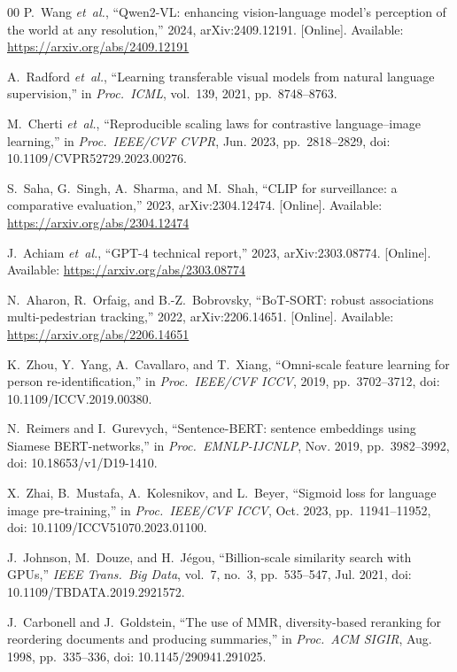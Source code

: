 ﻿\documentclass[conference]{IEEEtran}
\theoremstyle{definition}
\begin{document}
\begin{thebibliography}{00}
 P.~Wang \emph{et~al.}, ``Qwen2-VL: enhancing vision-language model's perception of the world at any resolution,'' 2024, arXiv:2409.12191. [Online]. Available: \url{https://arxiv.org/abs/2409.12191}

 A.~Radford \emph{et~al.}, ``Learning transferable visual models from natural language supervision,'' in \emph{Proc.\ ICML}, vol.~139, 2021, pp.~8748--8763.

 M.~Cherti \emph{et~al.}, ``Reproducible scaling laws for contrastive language--image learning,'' in \emph{Proc.\ IEEE/CVF CVPR}, Jun. 2023, pp.~2818--2829, doi: 10.1109/CVPR52729.2023.00276.

 S.~Saha, G.~Singh, A.~Sharma, and M.~Shah, ``CLIP for surveillance: a comparative evaluation,'' 2023, arXiv:2304.12474. [Online]. Available: \url{https://arxiv.org/abs/2304.12474}

 J.~Achiam \emph{et~al.}, ``GPT-4 technical report,'' 2023, arXiv:2303.08774. [Online]. Available: \url{https://arxiv.org/abs/2303.08774}

 N.~Aharon, R.~Orfaig, and B.-Z.~Bobrovsky, ``BoT-SORT: robust associations multi-pedestrian tracking,'' 2022, arXiv:2206.14651. [Online]. Available: \url{https://arxiv.org/abs/2206.14651}

 K.~Zhou, Y.~Yang, A.~Cavallaro, and T.~Xiang, ``Omni-scale feature learning for person re-identification,'' in \emph{Proc.\ IEEE/CVF ICCV}, 2019, pp.~3702--3712, doi: 10.1109/ICCV.2019.00380.

 N.~Reimers and I.~Gurevych, ``Sentence-BERT: sentence embeddings using Siamese BERT-networks,'' in \emph{Proc.\ EMNLP-IJCNLP}, Nov. 2019, pp.~3982--3992, doi: 10.18653/v1/D19-1410.

 X.~Zhai, B.~Mustafa, A.~Kolesnikov, and L.~Beyer, ``Sigmoid loss for language image pre-training,'' in \emph{Proc.\ IEEE/CVF ICCV}, Oct. 2023, pp.~11941--11952, doi: 10.1109/ICCV51070.2023.01100.

 J.~Johnson, M.~Douze, and H.~J\'egou, ``Billion-scale similarity search with GPUs,'' \emph{IEEE Trans.\ Big Data}, vol.~7, no.~3, pp.~535--547, Jul. 2021, doi: 10.1109/TBDATA.2019.2921572.

 J.~Carbonell and J.~Goldstein, ``The use of MMR, diversity-based reranking for reordering documents and producing summaries,'' in \emph{Proc.\ ACM SIGIR}, Aug. 1998, pp.~335--336, doi: 10.1145/290941.291025.


\end{thebibliography}
\end{document}
